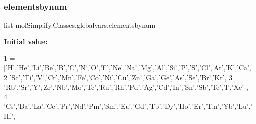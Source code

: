 \subsubsection{\texorpdfstring{elementsbynum}{elementsbynum}}
{\footnotesize\ttfamily list mol\+Simplify.\+Classes.\+globalvars.\+elementsbynum}

{\bfseries Initial value\+:}
\begin{DoxyCode}
1 = [\textcolor{stringliteral}{'H'},\textcolor{stringliteral}{'He'},\textcolor{stringliteral}{'Li'},\textcolor{stringliteral}{'Be'},\textcolor{stringliteral}{'B'},\textcolor{stringliteral}{'C'},\textcolor{stringliteral}{'N'},\textcolor{stringliteral}{'O'},\textcolor{stringliteral}{'F'},\textcolor{stringliteral}{'Ne'},\textcolor{stringliteral}{'Na'},\textcolor{stringliteral}{'Mg'},\textcolor{stringliteral}{'Al'},\textcolor{stringliteral}{'Si'},\textcolor{stringliteral}{'P'},\textcolor{stringliteral}{'S'},\textcolor{stringliteral}{'Cl'},\textcolor{stringliteral}{'Ar'},\textcolor{stringliteral}{'K'},\textcolor{stringliteral}{'Ca'},
2                     \textcolor{stringliteral}{'Sc'},\textcolor{stringliteral}{'Ti'},\textcolor{stringliteral}{'V'},\textcolor{stringliteral}{'Cr'},\textcolor{stringliteral}{'Mn'},\textcolor{stringliteral}{'Fe'},\textcolor{stringliteral}{'Co'},\textcolor{stringliteral}{'Ni'},\textcolor{stringliteral}{'Cu'},\textcolor{stringliteral}{'Zn'},\textcolor{stringliteral}{'Ga'},\textcolor{stringliteral}{'Ge'},\textcolor{stringliteral}{'As'},\textcolor{stringliteral}{'Se'},\textcolor{stringliteral}{'Br'},\textcolor{stringliteral}{'Kr'},
3                     \textcolor{stringliteral}{'Rb'},\textcolor{stringliteral}{'Sr'},\textcolor{stringliteral}{'Y'},\textcolor{stringliteral}{'Zr'},\textcolor{stringliteral}{'Nb'},\textcolor{stringliteral}{'Mo'},\textcolor{stringliteral}{'Tc'},\textcolor{stringliteral}{'Ru'},\textcolor{stringliteral}{'Rh'},\textcolor{stringliteral}{'Pd'},\textcolor{stringliteral}{'Ag'},\textcolor{stringliteral}{'Cd'},\textcolor{stringliteral}{'In'},\textcolor{stringliteral}{'Sn'},\textcolor{stringliteral}{'Sb'},\textcolor{stringliteral}{'Te'},\textcolor{stringliteral}{'I'},\textcolor{stringliteral}{'Xe'}
      ,
4             \textcolor{stringliteral}{'Cs'},\textcolor{stringliteral}{'Ba'},\textcolor{stringliteral}{'La'},\textcolor{stringliteral}{'Ce'},\textcolor{stringliteral}{'Pr'},\textcolor{stringliteral}{'Nd'},\textcolor{stringliteral}{'Pm'},\textcolor{stringliteral}{'Sm'},\textcolor{stringliteral}{'Eu'},\textcolor{stringliteral}{'Gd'},\textcolor{stringliteral}{'Tb'},\textcolor{stringliteral}{'Dy'},\textcolor{stringliteral}{'Ho'},\textcolor{stringliteral}{'Er'},\textcolor{stringliteral}{'Tm'},\textcolor{stringliteral}{'Yb'},\textcolor{stringliteral}{'Lu'},\textcolor{stringliteral}{'Hf'},

\end{DoxyCode}
